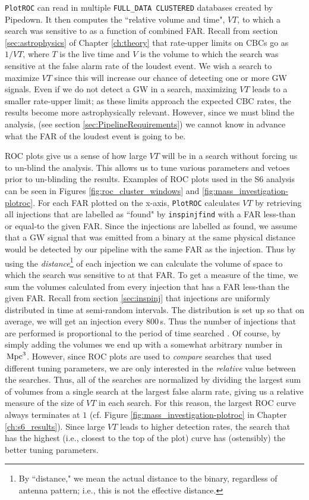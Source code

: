 \texttt{PlotROC} can read in multiple \verb|FULL_DATA CLUSTERED| databases
created by \\ Pipedown. It then computes the ``relative volume and time", $VT$, to
which a search was sensitive to as a function of combined \ac{FAR}. Recall from
section \ref{sec:astrophysics} of Chapter \ref{ch:theory} that rate-upper
limits on \acp{CBC} go as $1/VT$, where $T$ is the live time and $V$ is the
volume to which the search was sensitive at the false alarm rate of the loudest
event. We wish a search to maximize $VT$ since this will increase our chance of
detecting one or more \ac{GW} signals. Even if we do not detect a \ac{GW} in a
search, maximizing $VT$ leads to a smaller rate-upper limit; as these limits
approach the expected \ac{CBC} rates, the results become more astrophysically
relevant.  However, since we must blind the analysis, (see section
\ref{sec:PipelineRequirements}) we cannot know in advance what the \ac{FAR} of
the loudest event is going to be.

ROC plots give us a sense of how large $VT$ will be in a search without forcing
us to un-blind the analysis. This allows us to tune various parameters and
vetoes prior to un-blinding the results. Examples of ROC plots used in the
\ac{S6} analysis can be seen in Figures \ref{fig:roc_cluster_windows} and
\ref{fig:mass_investigation-plotroc}. For each \ac{FAR} plotted on the x-axis,
\texttt{PlotROC} calculates $VT$ by retrieving all injections that are labelled
as ``found" by \verb|inspinjfind| with a \ac{FAR} less-than or equal-to the
given \ac{FAR}. Since the injections are labelled as found, we assume that a
\ac{GW} signal that was emitted from a binary at the same physical distance
would be detected by our pipeline with the same \ac{FAR} as the injection. Thus
by using the \emph{distance}\footnote{By ``distance," we mean the actual
distance to the binary, regardless of antenna pattern; i.e., this is not the
effective distance.} of each injection we can calculate the volume of space to
which the search was sensitive to at that \ac{FAR}. To get a measure of the
time, we sum the volumes calculated from every injection that has a \ac{FAR}
less-than the given \ac{FAR}. Recall from section \ref{sec:inspinj} that
injections are uniformly distributed in time at semi-random intervals. The
distribution is set up so that on average, we will get an injection every
$800\,$s. Thus the number of injections that are performed is proportional to
the period of time searched \cite{Keppel:personal-comm}.  Of course, by simply
adding the volumes we end up with a somewhat arbitrary number in $\,\mathrm{Mpc}^3$.
However, since ROC plots are used to \emph{compare} searches that used
different tuning parameters, we are only interested in the \emph{relative}
value between the searches. Thus, all of the searches are normalized by
dividing the largest sum of volumes from a single search at the largest false
alarm rate, giving us a relative measure of the size of $VT$ in each search.
For this reason, the largest ROC curve always terminates at $1$ (cf. Figure
\ref{fig:mass_investigation-plotroc} in Chapter \ref{ch:s6_results}). Since
large $VT$ leads to higher detection rates, the search that has the highest
(i.e., closest to the top of the plot) curve has (ostensibly) the better tuning
parameters.


